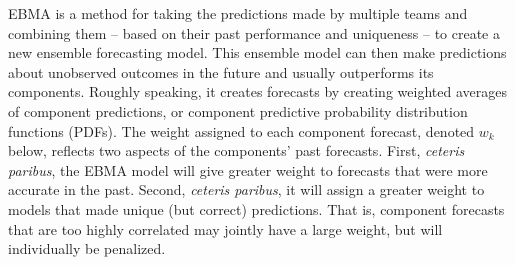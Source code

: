 EBMA is a method for taking the predictions made by multiple teams and
combining them -- based on their past performance and uniqueness -- to
create a new ensemble forecasting model.  This ensemble model can then
make predictions about unobserved outcomes in the future and usually
outperforms its components.  Roughly speaking, it creates forecasts by
creating weighted averages of component predictions, or component
predictive probability distribution functions (PDFs).  The weight
assigned to each component forecast, denoted $w_k$ below, reflects two
aspects of the components' past forecasts.  First, \textit{ceteris
  paribus}, the EBMA model will give greater weight to forecasts that
were more accurate in the past.  Second, \textit{ceteris paribus}, it
will assign a greater weight to models that made unique (but correct)
predictions.  That is, component forecasts that are too highly
correlated may jointly have a large weight, but will individually be
penalized.


